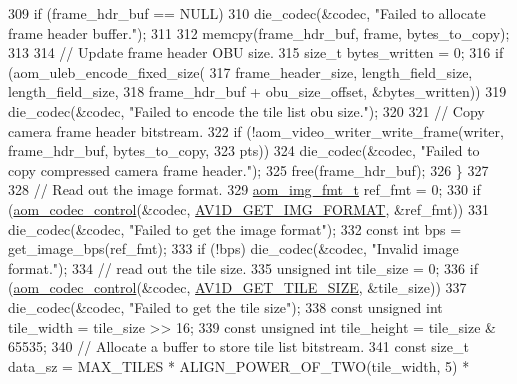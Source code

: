 \begin{DoxyCodeInclude}
{{{{{{309     \textcolor{keywordflow}{if} (frame\_hdr\_buf == NULL)
310       die\_codec(&codec, \textcolor{stringliteral}{"Failed to allocate frame header buffer."});
311 
312     memcpy(frame\_hdr\_buf, frame, bytes\_to\_copy);
313 
314     \textcolor{comment}{// Update frame header OBU size.}
315     \textcolor{keywordtype}{size\_t} bytes\_written = 0;
316     \textcolor{keywordflow}{if} (aom\_uleb\_encode\_fixed\_size(
317             frame\_header\_size, length\_field\_size, length\_field\_size,
318             frame\_hdr\_buf + obu\_size\_offset, &bytes\_written))
319       die\_codec(&codec, \textcolor{stringliteral}{"Failed to encode the tile list obu size."});
320 
321     \textcolor{comment}{// Copy camera frame header bitstream.}
322     \textcolor{keywordflow}{if} (!aom\_video\_writer\_write\_frame(writer, frame\_hdr\_buf, bytes\_to\_copy,
323                                       pts))
324       die\_codec(&codec, \textcolor{stringliteral}{"Failed to copy compressed camera frame header."});
325     free(frame\_hdr\_buf);
326   \}
327 
328   \textcolor{comment}{// Read out the image format.}
329   \hyperlink{aom__image_8h_ab71efff8c7f49380fad23b93bc2e9bfc}{aom\_img\_fmt\_t} ref\_fmt = 0;
330   \textcolor{keywordflow}{if} (\hyperlink{group__codec_ga6da974f4eeaba1fa74106b28d0fe6ac5}{aom\_codec\_control}(&codec, \hyperlink{group__aom__decoder_gga3865fd4b3192489baa9a5c3632ebe97bacd7229e5fb766670fe995739931c2ee3}{AV1D\_GET\_IMG\_FORMAT}, &ref\_fmt))
331     die\_codec(&codec, \textcolor{stringliteral}{"Failed to get the image format"});
332   \textcolor{keyword}{const} \textcolor{keywordtype}{int} bps = get\_image\_bps(ref\_fmt);
333   \textcolor{keywordflow}{if} (!bps) die\_codec(&codec, \textcolor{stringliteral}{"Invalid image format."});
334   \textcolor{comment}{// read out the tile size.}
335   \textcolor{keywordtype}{unsigned} \textcolor{keywordtype}{int} tile\_size = 0;
336   \textcolor{keywordflow}{if} (\hyperlink{group__codec_ga6da974f4eeaba1fa74106b28d0fe6ac5}{aom\_codec\_control}(&codec, \hyperlink{group__aom__decoder_gga3865fd4b3192489baa9a5c3632ebe97ba4d9799d9e520785870b8d1f73a19c3c4}{AV1D\_GET\_TILE\_SIZE}, &tile\_size))
337     die\_codec(&codec, \textcolor{stringliteral}{"Failed to get the tile size"});
338   \textcolor{keyword}{const} \textcolor{keywordtype}{unsigned} \textcolor{keywordtype}{int} tile\_width = tile\_size >> 16;
339   \textcolor{keyword}{const} \textcolor{keywordtype}{unsigned} \textcolor{keywordtype}{int} tile\_height = tile\_size & 65535;
340   \textcolor{comment}{// Allocate a buffer to store tile list bitstream.}
341   \textcolor{keyword}{const} \textcolor{keywordtype}{size\_t} data\_sz = MAX\_TILES * ALIGN\_POWER\_OF\_TWO(tile\_width, 5) *
}}}}}}
\end{DoxyCodeInclude}
